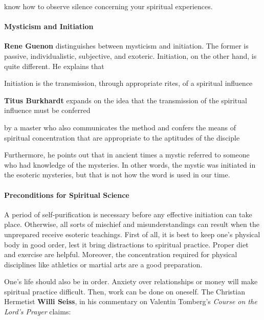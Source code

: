 \begin{quotex}
know how to observe silence concerning your spiritual experiences. 

\end{quotex}
\paragraph{Mysticism and Initiation}
\textbf{Rene Guenon} distinguishes between mysticism and initiation. The former is passive, individualistic, subjective, and exoteric. Initiation, on the other hand, is quite different. He explains that

\begin{quotex}
Initiation is the transmission, through appropriate rites, of a spiritual influence 

\end{quotex}
\textbf{Titus Burkhardt} expands on the idea that the transmission of the spiritual influence must be conferred

\begin{quotex}
by a master who also communicates the method and confers the means of spiritual concentration that are appropriate to the aptitudes of the disciple 

\end{quotex}
Furthermore, he points out that in ancient times a mystic referred to someone who had knowledge of the mysteries. In other words, the mystic was initiated in the esoteric mysteries, but that is not how the word is used in our time.

\paragraph{Preconditions for Spiritual Science}
A period of self-purification is necessary before any effective initiation can take place. Otherwise, all sorts of mischief and misunderstandings can result when the unprepared receive esoteric teachings. First of all, it is best to keep one's physical body in good order, lest it bring distractions to spiritual practice. Proper diet and exercise are helpful. Moreover, the concentration required for physical disciplines like athletics or martial arts are a good preparation.

One's life should also be in order. Anxiety over relationships or money will make spiritual practice difficult. Then, work can be done on oneself. The Christian Hermetist \textbf{Willi Seiss}, in his commentary on Valentin Tomberg's \emph{Course on the Lord's Prayer} claims:

